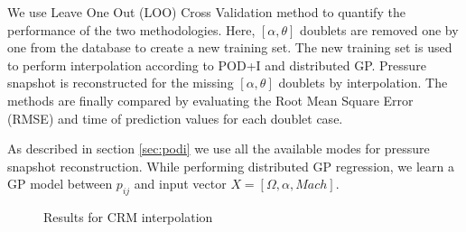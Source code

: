 We use Leave One Out (LOO) Cross Validation method to quantify the performance of the two methodologies. Here, $[\alpha, \theta]$ doublets are removed one by one from the database to create a new training set. The new training set is used to perform interpolation according to POD+I and distributed GP. Pressure snapshot is reconstructed for the missing $[\alpha, \theta]$ doublets by interpolation. The methods are finally compared by evaluating the Root Mean Square Error (RMSE) and time of prediction values for each doublet case. 

As described in section \ref{sec:podi} we use all the available modes for pressure snapshot reconstruction. While performing distributed GP regression, we learn a GP model between \(p_{ij}\) and input vector \(X = [\Omega, \alpha, Mach]\). 

\begin{figure}[!ht]
  \centering
  \quad
  \caption{Results for CRM interpolation}
\end{figure}

